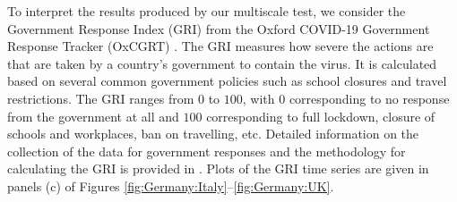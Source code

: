 \documentclass[a4paper,12pt]{article}
\numberwithin{equation}{section}
\begin{document}
To interpret the results produced by our multiscale test, we consider the Government Response Index (GRI) from the Oxford COVID-19 Government Response Tracker (OxCGRT) \citep{Hale2020}. The GRI measures how severe the actions are that are taken by a country's government to contain the virus. It is calculated based on several common government policies such as school closures and travel restrictions. The GRI ranges from $0$ to $100$, with $0$ corresponding to no response from the government at all and $100$ corresponding to full lockdown, closure of schools and workplaces, ban on travelling, etc. Detailed information on the collection of the data for government responses and the methodology for calculating the GRI is provided in \cite{Hale2020paper}. Plots of the GRI time series are given in panels (c) of Figures \ref{fig:Germany:Italy}--\ref{fig:Germany:UK}.



\end{document}

